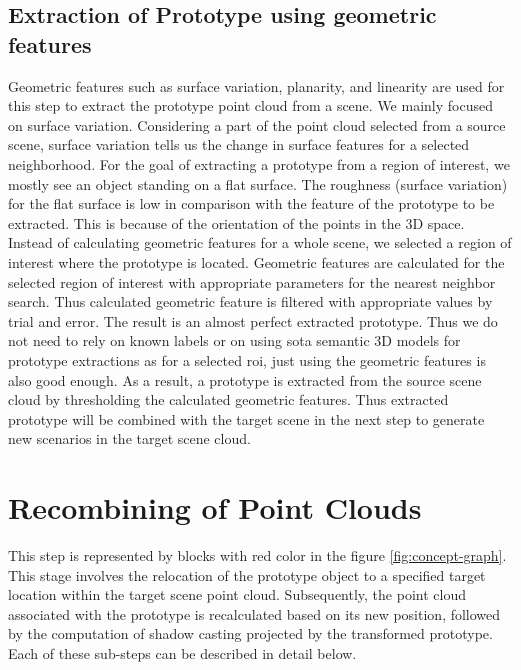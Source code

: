 \subsection{Extraction of Prototype using geometric features}
Geometric features such as surface variation, planarity, and linearity are used for this step to extract the prototype point cloud from a scene. We mainly focused on surface variation. Considering a part of the point cloud selected from a source scene, surface variation tells us the change in surface features for a selected neighborhood. For the goal of extracting a prototype from a region of interest, we mostly see an object standing on a flat surface. The roughness (surface variation) for the flat surface is low in comparison with the feature of the prototype to be extracted. This is because of the orientation of the points in the 3D space. Instead of calculating geometric features for a whole scene, we selected a region of interest where the prototype is located. Geometric features are calculated for the selected region of interest with appropriate parameters for the nearest neighbor search. Thus calculated geometric feature is filtered with appropriate values by trial and error. The result is an almost perfect extracted prototype. Thus we do not need to rely on known labels or on using \acrshort{sota} semantic 3D models for prototype extractions as for a selected \acrfull{roi}, just using the geometric features is also good enough. As a result, a prototype is extracted from the source scene cloud by thresholding the calculated geometric features. Thus extracted prototype will be combined with the target scene in the next step to generate new scenarios in the target scene cloud.

\section{Recombining of Point Clouds}
This step is represented by blocks with red color in the figure \ref{fig:concept-graph}. This stage involves the relocation of the prototype object to a specified target location within the target scene point cloud. Subsequently, the point cloud associated with the prototype is recalculated based on its new position, followed by the computation of shadow casting projected by the transformed prototype. Each of these sub-steps can be described in detail below.


